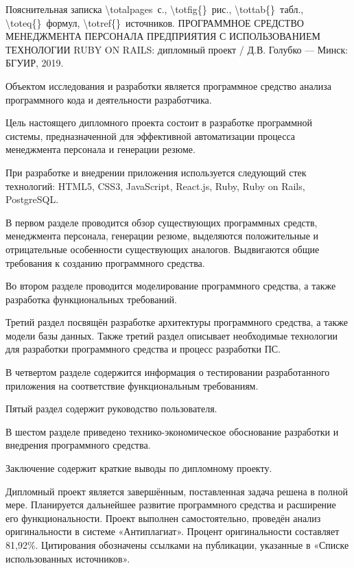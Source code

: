 \thispagestyle{empty}


\begin{center}
	Пояснительная записка \num{\totalpages}~с., \num{\totfig{}}~рис., \num{\tottab{}}~табл., \num{\toteq{}}~формул, \num{\totref{}}~источников.
	\MakeUppercase{Программное средство менеджмента персонала предприятия с использованием технологии Ruby on Rails}: 
	дипломный проект / Д.В. Голубко --- Минск: БГУИР, 2019.
\end{center}

Объектом исследования и разработки является программное средство анализа программного кода и деятельности разработчика.

Цель настоящего дипломного проекта состоит в разработке программной системы, предназначенной для эффективной
автоматизации процесса менеджмента персонала и генерации резюме. 

При разработке и внедрении приложения используется следующий стек технологий: HTML5, CSS3, JavaScript, React.js,
Ruby, Ruby on Rails, PostgreSQL.

В первом разделе проводится обзор существующих программных средств, менеджмента персонала, генерации резюме,
выделяются положительные и отрицательные особенности существующих аналогов.
Выдвигаются общие требования к созданию программного средства.

Во втором разделе проводится моделирование программного средства, а также разработка функциональных требований.

Третий раздел посвящён разработке архитектуры программного средства, а также модели базы данных.
Также третий раздел описывает необходимые технологии для разработки программного средства и процесс разработки ПС.

В четвертом разделе содержится информация о тестировании разработанного приложения на соответствие функциональным требованиям.

Пятый раздел содержит руководство пользователя.

В шестом разделе приведено технико-экономическое обоснование разработки и внедрения программного средства.

Заключение содержит краткие выводы по дипломному проекту.

Дипломный проект является завершённым, поставленная задача решена в полной мере. Планируется дальнейшее развитие
программного средства и расширение его функциональности. Проект выполнен самостоятельно, проведён анализ оригинальности
в системе «Антиплагиат». Процент оригинальности составляет 81,92\%. Цитирования обозначены ссылками на публикации,
указанные в «Списке использованных источников».
